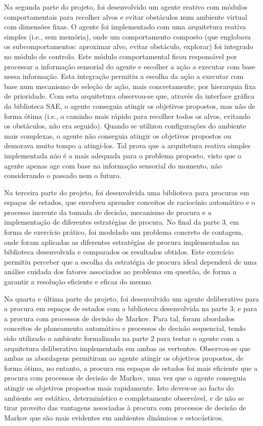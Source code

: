 Na segunda parte do projeto, foi desenvolvido um agente reativo com módulos comportamentais para recolher alvos e evitar obstáculos num ambiente virtual com dimensões fixas.
O agente foi implementado com uma arquitetura reativa simples (i.e., sem memória), onde um comportamento composto (que englobava os subcomportamentos: aproximar alvo, evitar obstáculo, explorar) foi integrado no módulo de controlo.
Este módulo comportamental ficou responsável por processar a informação sensorial do agente e escolher a ação a executar com base nessa informação.
Esta integração permitiu a escolha da ação a executar com base num mecanismo de seleção de ação, mais concretamente, por hierarquia fixa de prioridade.
Com esta arquitetura observou-se que, através da interface gráfica da biblioteca SAE, o agente conseguia atingir os objetivos propostos, mas não de forma ótima (i.e., o caminho mais rápido para recolher todos os alvos, evitando os obstáculos, não era seguido).
Quando se utilizou configurações do ambiente mais complexas, o agente não conseguia atingir os objetivos propostos ou demorava muito tempo a atingi-los.
Tal prova que a arquitetura reativa simples implementada não é a mais adequada para o problema proposto, visto que o agente apenas age com base na informação sensorial do momento, não considerando o passado nem o futuro.

Na terceira parte do projeto, foi desenvolvida uma biblioteca para procuras em espaços de estados, que envolveu aprender conceitos de raciocínio automático e o processo inerente da tomada de decisão, mecanismo de procura e a implementação de diferentes estratégias de procura.
No final da parte 3, em forma de exercício prático, foi modelado um problema concreto de contagem, onde foram aplicadas as diferentes estratégias de procura implementadas na biblioteca desenvolvida e comparados os resultados obtidos.
Este exercício permitiu perceber que a escolha da estratégia de procura ideal dependerá de uma análise cuidada dos fatores associados ao problema em questão, de forma a garantir a resolução eficiente e eficaz do mesmo.

Na quarta e última parte do projeto, foi desenvolvido um agente deliberativo para a procura em espaços de estados com a biblioteca desenvolvida na parte 3; e para a procura com processos de decisão de Markov.
Para tal, foram abordados conceitos de planeamento automático e processos de decisão sequencial, tendo sido utilizado o ambiente formalizado na parte 2 para testar o agente com a arquitetura deliberativa implementada em ambas as vertentes.
Observou-se que ambas as abordagens permitiram ao agente atingir os objetivos propostos, de forma ótima, no entanto, a procura em espaços de estados foi mais eficiente que a procura com processos de decisão de Markov, uma vez que o agente conseguia atingir os objetivos propostos mais rapidamente.
Isto deveu-se ao facto do ambiente ser estático, determinístico e completamente observável, e de não se tirar proveito das vantagens associadas à procura com processos de decisão de Markov que são mais evidentes em ambientes dinâmicos e estocásticos.

